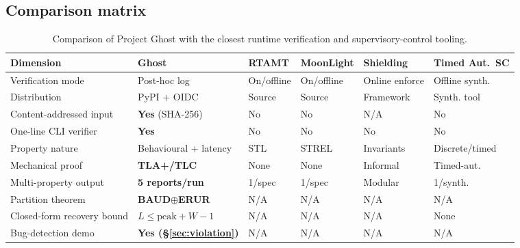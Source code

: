 \documentclass[acmsmall,nonacm=true,review=false]{acmart}
\theoremstyle{plain}
\begin{document}
\subsection{Comparison matrix}
\label{sec:comparison}

\begin{table}[h]
\centering
\small
\setlength{\tabcolsep}{4pt}
\begin{tabularx}{\linewidth}{l X X X X X}
\toprule
\textbf{Dimension} & \textbf{Ghost} & \textbf{RTAMT} & \textbf{MoonLight} & \textbf{Shielding} & \textbf{Timed Aut.~SC} \\
\midrule
Verification mode             & Post-hoc log              & On/offline      & On/offline      & Online enforce & Offline synth.\\
Distribution                  & PyPI + OIDC               & Source          & Source          & Framework       & Synth. tool   \\
Content-addressed input       & \textbf{Yes} (SHA-256)    & No              & No              & N/A             & No            \\
One-line CLI verifier         & \textbf{Yes}              & No              & No              & No              & No            \\
Property nature               & Behavioural + latency     & STL             & STREL           & Invariants      & Discrete/timed\\
Mechanical proof              & \textbf{TLA+/TLC}         & None            & None            & Informal        & Timed-aut.    \\
Multi-property output         & \textbf{5 reports/run}    & 1/spec          & 1/spec          & Modular         & 1/synth.      \\
Partition theorem             & \textbf{BAUD$\oplus$ERUR} & N/A             & N/A             & N/A             & N/A           \\
Closed-form recovery bound    & \textbf{$L\le \mathrm{peak}+W-1$} & N/A     & N/A             & N/A             & None          \\
Bug-detection demo            & \textbf{Yes (\S\ref{sec:violation})} & N/A  & N/A             & N/A             & N/A           \\
\bottomrule
\end{tabularx}
\caption{Comparison of Project Ghost with the closest runtime
         verification and supervisory-control tooling.}
\label{tab:comparison}
\end{table}
\end{document}

